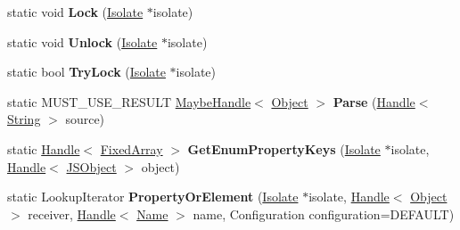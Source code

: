 \begin{DoxyCompactItemize}
\item 
static void {\bfseries Lock} (\hyperlink{classv8_1_1internal_1_1_isolate}{Isolate} $\ast$isolate)\hypertarget{classv8_1_1internal_1_1_b_a_s_e___e_m_b_e_d_d_e_d_a4ed41f66cb24187d780412ae4f828ebb}{}\label{classv8_1_1internal_1_1_b_a_s_e___e_m_b_e_d_d_e_d_a4ed41f66cb24187d780412ae4f828ebb}

\item 
static void {\bfseries Unlock} (\hyperlink{classv8_1_1internal_1_1_isolate}{Isolate} $\ast$isolate)\hypertarget{classv8_1_1internal_1_1_b_a_s_e___e_m_b_e_d_d_e_d_ad0af515ef04872fdf456c97d50ea77e8}{}\label{classv8_1_1internal_1_1_b_a_s_e___e_m_b_e_d_d_e_d_ad0af515ef04872fdf456c97d50ea77e8}

\item 
static bool {\bfseries Try\+Lock} (\hyperlink{classv8_1_1internal_1_1_isolate}{Isolate} $\ast$isolate)\hypertarget{classv8_1_1internal_1_1_b_a_s_e___e_m_b_e_d_d_e_d_ae2e48e6794f1c1e9f0396e46637a5c1e}{}\label{classv8_1_1internal_1_1_b_a_s_e___e_m_b_e_d_d_e_d_ae2e48e6794f1c1e9f0396e46637a5c1e}

\item 
static M\+U\+S\+T\+\_\+\+U\+S\+E\+\_\+\+R\+E\+S\+U\+LT \hyperlink{classv8_1_1internal_1_1_maybe_handle}{Maybe\+Handle}$<$ \hyperlink{classv8_1_1internal_1_1_object}{Object} $>$ {\bfseries Parse} (\hyperlink{classv8_1_1internal_1_1_handle}{Handle}$<$ \hyperlink{classv8_1_1internal_1_1_string}{String} $>$ source)\hypertarget{classv8_1_1internal_1_1_b_a_s_e___e_m_b_e_d_d_e_d_af8e38d71e111408d1904ee643156d847}{}\label{classv8_1_1internal_1_1_b_a_s_e___e_m_b_e_d_d_e_d_af8e38d71e111408d1904ee643156d847}

\item 
static \hyperlink{classv8_1_1internal_1_1_handle}{Handle}$<$ \hyperlink{classv8_1_1internal_1_1_fixed_array}{Fixed\+Array} $>$ {\bfseries Get\+Enum\+Property\+Keys} (\hyperlink{classv8_1_1internal_1_1_isolate}{Isolate} $\ast$isolate, \hyperlink{classv8_1_1internal_1_1_handle}{Handle}$<$ \hyperlink{classv8_1_1internal_1_1_j_s_object}{J\+S\+Object} $>$ object)\hypertarget{classv8_1_1internal_1_1_b_a_s_e___e_m_b_e_d_d_e_d_a6e6278f95b5399abcc24a4c5cb7b219c}{}\label{classv8_1_1internal_1_1_b_a_s_e___e_m_b_e_d_d_e_d_a6e6278f95b5399abcc24a4c5cb7b219c}

\item 
static Lookup\+Iterator {\bfseries Property\+Or\+Element} (\hyperlink{classv8_1_1internal_1_1_isolate}{Isolate} $\ast$isolate, \hyperlink{classv8_1_1internal_1_1_handle}{Handle}$<$ \hyperlink{classv8_1_1internal_1_1_object}{Object} $>$ receiver, \hyperlink{classv8_1_1internal_1_1_handle}{Handle}$<$ \hyperlink{classv8_1_1internal_1_1_name}{Name} $>$ name, Configuration configuration=D\+E\+F\+A\+U\+LT)\hypertarget{classv8_1_1internal_1_1_b_a_s_e___e_m_b_e_d_d_e_d_ac46bcbb295cb75faf39ccc892238678b}{}\label{classv8_1_1internal_1_1_b_a_s_e___e_m_b_e_d_d_e_d_ac46bcbb295cb75faf39ccc892238678b}


\end{DoxyCompactItemize}
